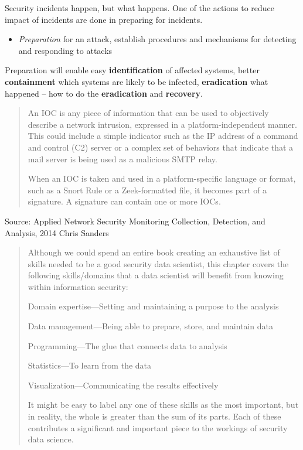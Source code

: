 \documentclass[Screen16to9,17pt]{foils}
\begin{document}


Security incidents happen, but what happens. One of the actions to reduce impact of incidents are done in preparing for incidents.

\begin{itemize}
\item \emph{Preparation} for an attack, establish procedures and mechanisms for detecting and responding to attacks
\end{itemize}

Preparation will enable easy {\bf identification} of affected systems, better {\bf containment} which systems are likely to be infected, {\bf eradication} what happened -- how to do the {\bf eradication} and {\bf recovery}.




\begin{quote}
An IOC is any piece of information that can be used to objectively describe a network intrusion, expressed in a platform-independent manner. This could include a simple indicator such as the IP address of a command and control (C2) server or a complex set of behaviors that indicate that a mail server is being used as a malicious SMTP relay.

When an IOC is taken and used in a platform-specific language or format, such as a Snort Rule or a Zeek-formatted file, it becomes part of a signature. A signature can contain one or more IOCs.
\end{quote}

Source: Applied Network Security Monitoring Collection, Detection, and Analysis, 2014 Chris Sanders



\begin{quote}
Although we could spend an entire book creating an exhaustive list of skills needed to be a good security data scientist, this chapter covers the following skills/domains that a data scientist will benefit from
knowing within information security:
\begin{list2}
\item Domain expertise—Setting and maintaining a purpose to the analysis
\item Data management—Being able to prepare, store, and maintain data
\item Programming—The glue that connects data to analysis
\item Statistics—To learn from the data
\item Visualization—Communicating the results effectively
\end{list2}
It might be easy to label any one of these skills as the most important, but in reality, the whole is greater than the sum of its parts. Each of these contributes a significant and important piece to the workings of
security data science.
\end{quote}
\end{document}
